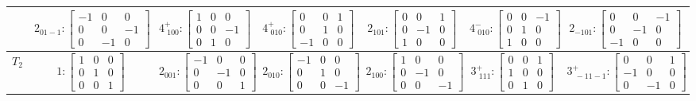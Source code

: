 \documentclass[fleqn,8pt,landscape]{jsarticle}
\begin{document}
\begin{longtable}{ccccccc}
& $ 2{}_{01-1}:\begin{bmatrix} -1 & 0 & 0 \\ 0 & 0 & -1 \\ 0 & -1 & 0 \end{bmatrix} $ & $ 4^{+}_{\,\,100}:\begin{bmatrix} 1 & 0 & 0 \\ 0 & 0 & -1 \\ 0 & 1 & 0 \end{bmatrix} $ & $ 4^{+}_{\,\,010}:\begin{bmatrix} 0 & 0 & 1 \\ 0 & 1 & 0 \\ -1 & 0 & 0 \end{bmatrix} $ & $ 2{}_{101}:\begin{bmatrix} 0 & 0 & 1 \\ 0 & -1 & 0 \\ 1 & 0 & 0 \end{bmatrix} $ & $ 4^{-}_{\,\,010}:\begin{bmatrix} 0 & 0 & -1 \\ 0 & 1 & 0 \\ 1 & 0 & 0 \end{bmatrix} $ & $ 2{}_{-101}:\begin{bmatrix} 0 & 0 & -1 \\ 0 & -1 & 0 \\ -1 & 0 & 0 \end{bmatrix} $ \\ \hline
$ T_{2} $ & $ 1:\begin{bmatrix} 1 & 0 & 0 \\ 0 & 1 & 0 \\ 0 & 0 & 1 \end{bmatrix} $ & $ 2{}_{001}:\begin{bmatrix} -1 & 0 & 0 \\ 0 & -1 & 0 \\ 0 & 0 & 1 \end{bmatrix} $ & $ 2{}_{010}:\begin{bmatrix} -1 & 0 & 0 \\ 0 & 1 & 0 \\ 0 & 0 & -1 \end{bmatrix} $ & $ 2{}_{100}:\begin{bmatrix} 1 & 0 & 0 \\ 0 & -1 & 0 \\ 0 & 0 & -1 \end{bmatrix} $ & $ 3^{+}_{\,\,111}:\begin{bmatrix} 0 & 0 & 1 \\ 1 & 0 & 0 \\ 0 & 1 & 0 \end{bmatrix} $ & $ 3^{+}_{\,\,-11-1}:\begin{bmatrix} 0 & 0 & 1 \\ -1 & 0 & 0 \\ 0 & -1 & 0 \end{bmatrix} $ \\

\end{longtable}
\end{document}
